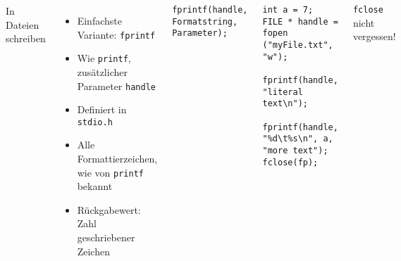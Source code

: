\begin{frame}[fragile]
%
\begin{columns}[T]
\begin{Large}
In Dateien schreiben
\vspace{10pt}
\end{Large}
%
\begin{itemize}
\item Einfachste Variante: \texttt{fprintf}
\item Wie \texttt{printf}, zusätzlicher Parameter \texttt{handle}
\item Definiert in \texttt{stdio.h}
\item Alle Formattierzeichen, wie von \texttt{printf} bekannt
\item Rückgabewert: Zahl geschriebener Zeichen
\end{itemize}
%
\begin{codebox}[Syntax]
\begin{verbatim}
fprintf(handle, Formatstring, Parameter);
\end{verbatim}
\end{codebox}
%
\begin{codebox}[Beispiel]
\begin{verbatim}
int a = 7;
FILE * handle = fopen ("myFile.txt", "w");
  fprintf(handle, "literal text\n");
  fprintf(handle, "%d\t%s\n", a, "more text");
fclose(fp);
\end{verbatim}
\end{codebox}
%
\begin{warnbox}
\texttt{fclose} nicht vergessen!
\end{warnbox}
\end{columns}
%
\end{frame}


